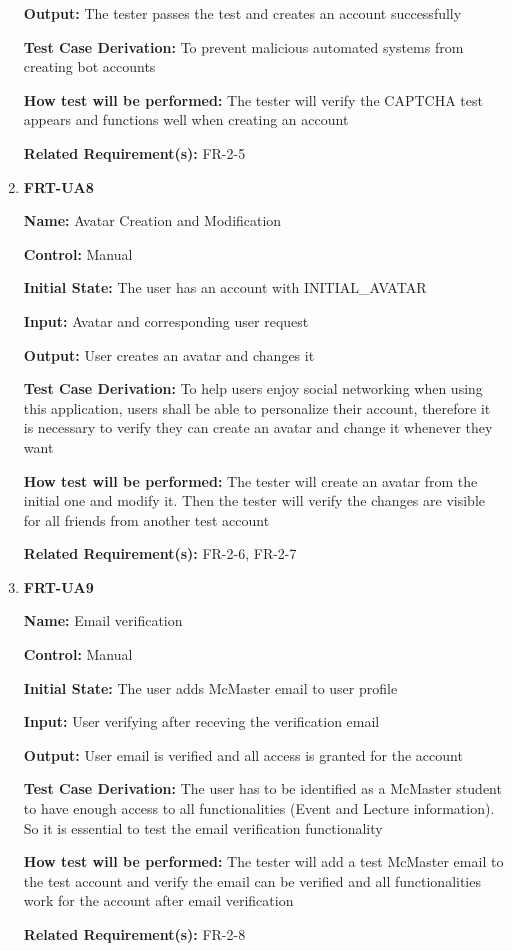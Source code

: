 \documentclass[12pt, titlepage]{article}
\begin{document}
\begin{enumerate}
\textbf{Output:} The tester passes the test and creates an account successfully

\textbf{Test Case Derivation:} To prevent malicious automated systems from creating bot accounts
					
\textbf{How test will be performed:} The tester will verify the CAPTCHA test appears and functions well when creating an account

\textbf{Related Requirement(s):} FR-2-5

\item{\textbf{FRT-UA8}}

\textbf{Name:} Avatar Creation and Modification

\textbf{Control:} Manual
					
\textbf{Initial State:} The user has an account with INITIAL\_AVATAR

\textbf{Input:} Avatar and corresponding user request
					
\textbf{Output:} User creates an avatar and changes it

\textbf{Test Case Derivation:} To help users enjoy social networking when using this application, users shall be able to personalize their account, therefore it is necessary to verify they can create an avatar and change it whenever they want
					
\textbf{How test will be performed:} The tester will create an avatar from the initial one and modify it. Then the tester will verify the changes are visible for all friends from another test account

\textbf{Related Requirement(s):} FR-2-6, FR-2-7

\item{\textbf{FRT-UA9}}

\textbf{Name:} Email verification

\textbf{Control:} Manual
					
\textbf{Initial State:} The user adds McMaster email to user profile

\textbf{Input:} User verifying after receving the verification email
					
\textbf{Output:} User email is verified and all access is granted for the account

\textbf{Test Case Derivation:} The user has to be identified as a McMaster student to have enough access to all functionalities (Event and Lecture information). So it is essential to test the email verification functionality
					
\textbf{How test will be performed:} The tester will add a test McMaster email to the test account and verify the email can be verified and all functionalities work for the account after email verification

\textbf{Related Requirement(s):} FR-2-8
\end{enumerate}
\end{document}
